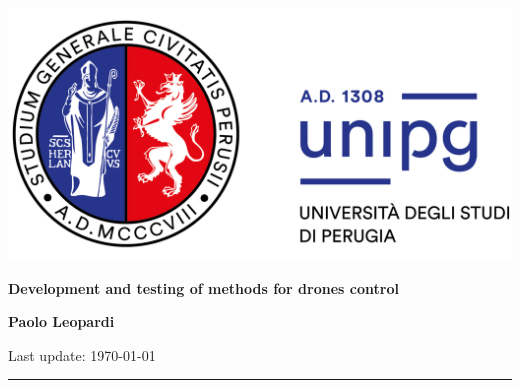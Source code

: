 \begin{titlepage}
	
	
	\begin{center}
		
		\includegraphics[scale=.1]{unipg-logo-title-2364x1862.png} 
		
		   	
		
		\vspace{1cm}
		
		
		\vspace{.5cm}
		\textbf{\LARGE{Development and testing of methods for drones control}}
		
		\vspace{1cm}
		
		
		
		\textbf{Paolo Leopardi}\\
		\vspace{1cm}
		
		\begin{flushright}
			{\small Last update: \today}
		\end{flushright}
		\vspace{-.5cm}
		\rule{\textwidth}{.1cm}
		
	\end{center}
	
	\tableofcontents
	
	
\end{titlepage}